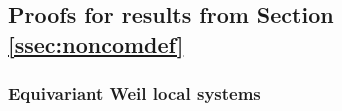 \documentclass[10pt]{amsart}
\theoremstyle{plain}
\theoremstyle{definition}
\newcommand{\ab}{_{\operatorname{ab}}}
\begin{document}





\subsection{Proofs for results from Section \ref{ssec:noncomdef}} \label{ssec:proofs}

\subsubsection{Equivariant Weil local systems}\label{ssec:equivariant1}
\end{document}
